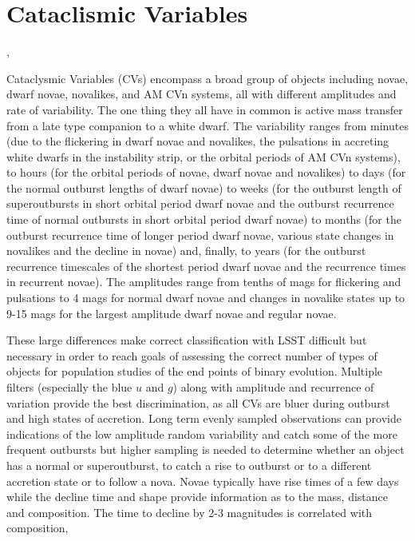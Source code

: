 %
%
%
%
%
%
%
%

\section{Cataclismic Variables}
\def\secname{CVtransients}\label{sec:\secname} %

,  %

Cataclysmic Variables (CVs) encompass a broad group of objects
including novae, dwarf novae, novalikes, and AM CVn systems, all with different
amplitudes and rate of variability. The one thing they all have in
common is active mass transfer from a late type companion to a
white dwarf. The variability ranges from minutes (due to the flickering in
dwarf novae and novalikes, the pulsations in accreting white dwarfs in
the instability strip, or the orbital periods of AM CVn systems), to
hours (for the orbital periods of novae, dwarf novae and novalikes) to
days (for the normal outburst lengths of dwarf novae) to 
weeks (for the outburst length of superoutbursts in short orbital period
dwarf novae and the outburst recurrence time of normal outbursts in short
orbital period dwarf novae) to months (for the outburst recurrence time of 
longer period dwarf novae, various state changes in novalikes and the decline 
in novae) and, finally, to years (for the outburst recurrence timescales of the 
shortest period dwarf novae and the recurrence times in recurrent novae). The 
amplitudes range from tenths of mags for flickering and pulsations to 4 mags 
for normal dwarf novae and changes in novalike states up to 9-15 mags for the 
largest amplitude dwarf novae and regular novae.

These large differences make correct classification with LSST difficult
but necessary in order to reach goals of assessing the correct number
of types of objects for population studies of the end points of
binary evolution. Multiple filters (especially the blue $u$ and $g$) 
along with amplitude and recurrence of variation provide the best
discrimination, as all CVs are bluer during outburst and high states of
accretion. Long term evenly sampled observations can provide indications
of the low amplitude random variability and catch some of the more frequent
outbursts but higher sampling is needed to determine whether an object
has a normal or superoutburst, to catch a rise to outburst or to a
different accretion state or to follow a nova. Novae typically
have rise times of a few days while the decline time and shape provide
information as to the mass, distance and composition. The time to decline
by 2-3 magnitudes is correlated with composition,

